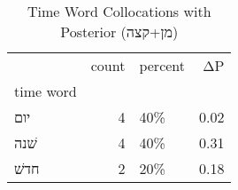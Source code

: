 \begin{table}[htbp!]
\centering
\caption{Time Word Collocations with Posterior (מן+קצה)}
\label{table:postמן+קצה_head_cpd}
\begin{tabular}{lrlr}
\toprule
{} &  count & percent &    ΔP \\
time word &        &         &       \\
\midrule
יום       &      4 &     40\% &  0.02 \\
שׁנה      &      4 &     40\% &  0.31 \\
חדשׁ      &      2 &     20\% &  0.18 \\
\bottomrule
\end{tabular}
\end{table}
